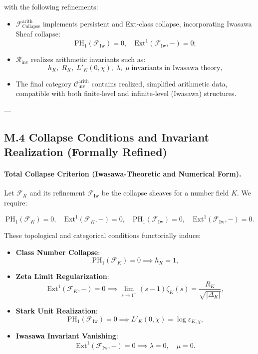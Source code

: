 \documentclass[11pt]{article}
\begin{document}
with the following refinements:
\begin{itemize}
  \item \( \mathcal{F}_{\mathrm{Collapse}}^{\mathrm{arith}} \) implements persistent and Ext-class collapse, incorporating Iwasawa Sheaf collapse:
  \[
  \mathrm{PH}_1(\mathcal{F}_{\mathrm{Iw}}) = 0, \quad \mathrm{Ext}^1(\mathcal{F}_{\mathrm{Iw}}, -) = 0;
  \]
  \item \( \mathcal{R}_{\mathrm{inv}} \) realizes arithmetic invariants such as:
  \[
  h_K,\; R_K,\; L'_K(0,\chi),\; \lambda,\;\mu\;\text{invariants in Iwasawa theory},
  \]
  \item The final category \( \mathcal{C}_{\mathrm{inv}}^{\mathrm{arith}} \) contains realized, simplified arithmetic data, compatible with both finite-level and infinite-level (Iwasawa) structures.
\end{itemize}

---

\subsection*{M.4 Collapse Conditions and Invariant Realization (Formally Refined)}

\paragraph{Total Collapse Criterion (Iwasawa-Theoretic and Numerical Form).}
Let \( \mathcal{F}_K \) and its refinement \( \mathcal{F}_{\mathrm{Iw}} \) be the collapse sheaves for a number field \( K \). We require:

\[
\mathrm{PH}_1(\mathcal{F}_K) = 0, \quad \mathrm{Ext}^1(\mathcal{F}_K, -) = 0, \quad \mathrm{PH}_1(\mathcal{F}_{\mathrm{Iw}}) = 0, \quad \mathrm{Ext}^1(\mathcal{F}_{\mathrm{Iw}}, -) = 0.
\]

These topological and categorical conditions functorially induce:

\begin{itemize}
  \item \textbf{Class Number Collapse}:
  \[
  \mathrm{PH}_1(\mathcal{F}_K) = 0 \implies h_K = 1,
  \]
  \item \textbf{Zeta Limit Regularization}:
  \[
  \mathrm{Ext}^1(\mathcal{F}_K, -) = 0 \implies \lim_{s \to 1^+} (s - 1)\zeta_K(s) = \dfrac{R_K}{\sqrt{|\Delta_K|}},
  \]
  \item \textbf{Stark Unit Realization}:
  \[
  \mathrm{PH}_1(\mathcal{F}_{\mathrm{Iw}}) = 0 \implies L'_K(0,\chi) = \log \varepsilon_{K,\chi},
  \]
  \item \textbf{Iwasawa Invariant Vanishing}:
  \[
  \mathrm{Ext}^1(\mathcal{F}_{\mathrm{Iw}}, -) = 0 \implies \lambda = 0, \quad \mu = 0.
  \]
\end{itemize}
\end{document}
